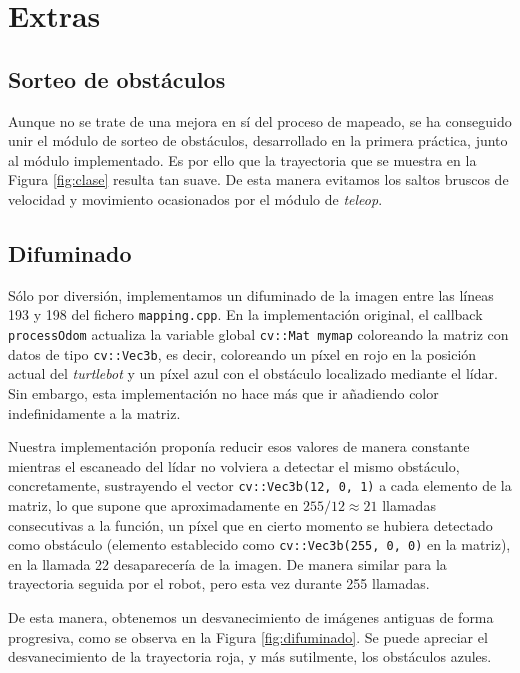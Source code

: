 \section{Extras}

\subsection{Sorteo de obstáculos}

Aunque no se trate de una mejora en sí del proceso de mapeado, se ha conseguido unir el módulo de sorteo de obstáculos, desarrollado en la primera práctica, junto al módulo implementado. Es por ello que la trayectoria que se muestra en la Figura \ref{fig:clase} resulta tan suave. De esta manera evitamos los saltos bruscos de velocidad y movimiento ocasionados por el módulo de \emph{teleop}.

\subsection{Difuminado}

Sólo por diversión, implementamos un difuminado de la imagen entre las líneas 193 y 198 del fichero \texttt{mapping.cpp}. En la implementación original, el callback \texttt{processOdom} actualiza la variable global \texttt{cv::Mat mymap} coloreando la matriz con datos de tipo \texttt{cv::Vec3b}, es decir, coloreando un píxel en rojo en la posición actual del \emph{turtlebot} y un píxel azul con el obstáculo localizado mediante el lídar. Sin embargo, esta implementación no hace más que ir añadiendo color indefinidamente a la matriz.

Nuestra implementación proponía reducir esos valores de manera constante mientras el escaneado del lídar no volviera a detectar el mismo obstáculo, concretamente, sustrayendo el vector \texttt{cv::Vec3b(12, 0, 1)} a cada elemento de la matriz, lo que supone que aproximadamente en $255 / 12 \approx 21 $ llamadas consecutivas a la función, un píxel que en cierto momento se hubiera detectado como obstáculo (elemento establecido como \texttt{cv::Vec3b(255, 0, 0)} en la matriz), en la llamada 22 desaparecería de la imagen. De manera similar para la trayectoria seguida por el robot, pero esta vez durante 255 llamadas. 

De esta manera, obtenemos un desvanecimiento de imágenes antiguas de forma progresiva, como se observa en la Figura \ref{fig:difuminado}. Se puede apreciar el desvanecimiento de la trayectoria roja, y más sutilmente, los obstáculos azules.


